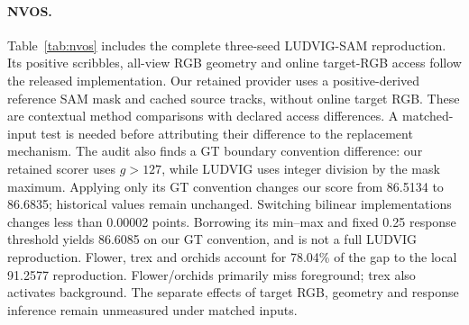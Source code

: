 \begin{table}[ht]
\centering\small
\resizebox{\linewidth}{!}{}
\caption{ScanNet OVS. P rows from VALA Table 2~\cite{vala}, R and the metric
bridge use paper8 Gaussian scoring. Rows marked 10-mesh use the original
ten-room mesh evaluation and cannot be ranked against the paper8 rows.
The metric bridge still differs in geometry and teacher access.}
\label{tab:scannet}
\end{table}

\paragraph{NVOS.}
Table~\ref{tab:nvos} includes the complete three-seed LUDVIG-SAM reproduction.
Its positive scribbles, all-view RGB geometry and online target-RGB access
follow the released implementation. Our retained provider uses a
positive-derived reference SAM mask and cached source tracks, without online
target RGB. These are contextual method comparisons with declared access
differences. A matched-input test is needed before attributing their difference
to the replacement mechanism.
The audit also finds a GT boundary convention difference: our retained scorer
uses $g>127$, while LUDVIG uses integer division by the mask maximum. Applying
only its GT convention changes our score from 86.5134 to 86.6835; historical
values remain unchanged. Switching bilinear implementations changes less than
0.00002 points. Borrowing its min--max and fixed 0.25 response threshold yields
86.6085 on our GT convention, and is not a full LUDVIG reproduction. Flower,
trex and orchids account for 78.04\% of the gap to the local 91.2577 reproduction.
Flower/orchids primarily miss foreground; trex also activates background.
The separate effects of target RGB, geometry and response inference remain
unmeasured under matched inputs.
\begin{table}[ht]
\centering\small
\caption{NVOS eight-task IoU. P values are reported in LUDVIG Tables 1/D~\cite{ludvig}.
R averages all three seeds in each task. B uses a different reference/source
contract; its new learned replacement remains pending.}
\label{tab:nvos}
\end{table}

